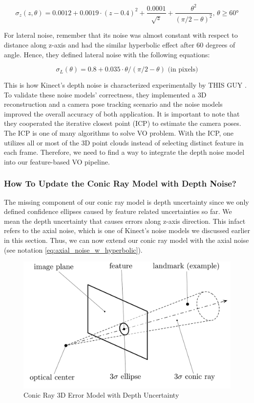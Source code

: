 \documentclass[a4paper]{report}
\numberwithin{figure}{section}
\begin{document}
\begin{equation}
  \sigma_z (z,\theta) = 0.0012 + 0.0019 \cdot (z-0.4)^2 + 
  \frac{0.0001}{\sqrt{z}} + 
  \frac{\theta^2}{(\pi/2 - \theta)^2}
  \text{, }
  \theta \geq \ang{60}
\end{equation} \label{eq:axial_noise_w_hyperbolic}

For lateral noise, remember that its noise was almost constant with respect to 
distance along z-axis and had the similar hyperbolic effect after 60 degrees of 
angle. Hence, they defined lateral noise with the following equations:

\begin{equation}
  \sigma_L(\theta) = 0.8 + 0.035 \cdot \theta/(\pi/2-\theta) \text{ (in pixels)}
\end{equation}

This is how Kinect's depth noise is characterized experimentally by 
THIS GUY \cite{}. To validate these noise models' correctness, they implemented a 3D 
reconstruction and a camera pose tracking scenario and the noise models 
improved the overall accuracy of both application. It is important to 
note that they cooperated the iterative closest point (ICP) to estimate 
the camera poses. The ICP is one of many algorithms to solve VO problem. 
With the ICP, one utilizes all or most of the 3D point clouds instead of 
selecting distinct feature in each frame. Therefore, we need to find a way 
to integrate the depth noise model into our feature-based VO pipeline.

\subsubsection{How To Update the Conic Ray Model with Depth Noise?}

The missing component of our conic ray model is depth uncertainty since 
we only defined confidence ellipses caused by feature related uncertainties so far.
We mean the depth uncertainty that causes errors along z-axis direction. 
This infact refers to the axial noise, which is one of Kinect's noise models 
we discussed earlier in this section.
Thus, we can now extend our conic ray model with the axial noise 
(see notation \ref{eq:axial_noise_w_hyperbolic}).

\begin{figure}[H]
	\centering
  \includegraphics[width=0.7\linewidth,natwidth=640,natheight=640]
  {fig/ref_imgs/conic_ray_3d_model.png}
  \caption{Conic Ray 3D Error Model with Depth Uncertainty}
	\label{fig:conic_ray_3d_error_model}
\end{figure}
\end{document}
